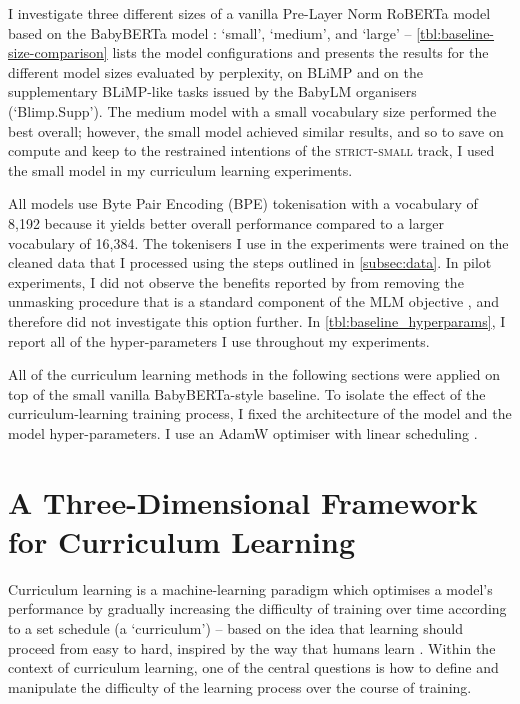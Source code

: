 I investigate three different sizes of a vanilla Pre-Layer Norm RoBERTa model \citep{liu2019roberta} based on the BabyBERTa model \citep{huebner2021babyberta}: `small', `medium', and `large' -- \cref{tbl:baseline-size-comparison} lists the model configurations and presents the results for the different model sizes evaluated by perplexity, on BLiMP \citep{warstadt2020blimp} and on the supplementary BLiMP-like tasks issued by the BabyLM organisers (`Blimp.Supp'). The medium model with a small vocabulary size performed the best overall; however, the small model achieved similar results, and so to save on compute and keep to the restrained intentions of the \textsc{strict-small} track, I used the small model in my curriculum learning experiments.

All models use Byte Pair Encoding (BPE) tokenisation \citep{gage1994bpe} with a vocabulary of 8,192 because it yields better overall performance compared to a larger vocabulary of 16,384. The tokenisers I use in the experiments were trained on the cleaned data that I processed using the steps outlined in \cref{subsec:data}. In pilot experiments, I did not observe the benefits reported by \citet{huebner2021babyberta} from removing the unmasking procedure that is a standard component of the MLM objective \citep{devlin2019bert}, and therefore did not investigate this option further. In \cref{tbl:baseline_hyperparams}, I report all of the hyper-parameters I use throughout my experiments.

All of the curriculum learning methods in the following sections were applied on top of the small vanilla BabyBERTa-style baseline. To isolate the effect of the curriculum-learning training process, I fixed the architecture of the model and the model hyper-parameters. I use an AdamW optimiser with linear scheduling \citep{loshchilov2019decoupled}.

\section{A Three-Dimensional Framework for Curriculum Learning}
Curriculum learning \citep{bengio2009curriculum} is a machine-learning paradigm which optimises a model's performance by gradually increasing the difficulty of training over time according to a set schedule (a `curriculum') -- based on the idea that learning should proceed from easy to hard, inspired by the way that humans learn \citep{elman1993learning}.
Within the context of curriculum learning, one of the central questions is how to define and manipulate the difficulty of the learning process over the course of training. 

